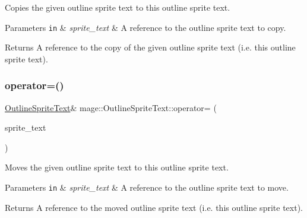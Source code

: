 Copies the given outline sprite text to this outline sprite text.


\begin{DoxyParams}[1]{Parameters}
\mbox{\tt in}  & {\em sprite\+\_\+text} & A reference to the outline sprite text to copy. \\
\hline
\end{DoxyParams}
\begin{DoxyReturn}{Returns}
A reference to the copy of the given outline sprite text (i.\+e. this outline sprite text). 
\end{DoxyReturn}
\hypertarget{classmage_1_1_outline_sprite_text_a3549e97af5461728a399f01af9125486}{}\label{classmage_1_1_outline_sprite_text_a3549e97af5461728a399f01af9125486} 
\subsubsection{\texorpdfstring{operator=()}{operator=()}\hspace{0.1cm}{\footnotesize\ttfamily [2/2]}}
{\footnotesize\ttfamily \hyperlink{classmage_1_1_outline_sprite_text}{Outline\+Sprite\+Text}\& mage\+::\+Outline\+Sprite\+Text\+::operator= (\begin{DoxyParamCaption}\item[{\hyperlink{classmage_1_1_outline_sprite_text}{Outline\+Sprite\+Text} \&\&}]{sprite\+\_\+text }\end{DoxyParamCaption})\hspace{0.3cm}{\ttfamily [delete]}}

Moves the given outline sprite text to this outline sprite text.


\begin{DoxyParams}[1]{Parameters}
\mbox{\tt in}  & {\em sprite\+\_\+text} & A reference to the outline sprite text to move. \\
\hline
\end{DoxyParams}
\begin{DoxyReturn}{Returns}
A reference to the moved outline sprite text (i.\+e. this outline sprite text). 
\end{DoxyReturn}
\hypertarget{classmage_1_1_outline_sprite_text_a66b448443de5a459bb28f66c682a12bd}{}\label{classmage_1_1_outline_sprite_text_a66b448443de5a459bb28f66c682a12bd} 
